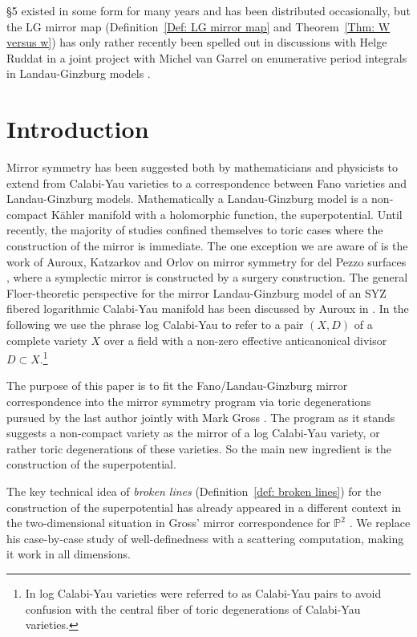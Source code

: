 \documentclass[11pt,letter]{amsart}
\theoremstyle{definition}
\theoremstyle{remark}
\numberwithin{equation}{section}
\numberwithin{figure}{section}
\newcommand{\PP} {\mathbb{P}}
\begin{document}
\S5 existed in some form for many years and has been distributed occasionally,
but the LG mirror map (Definition~\ref{Def: LG mirror map} and Theorem~\ref{Thm:
W versus w}) has only rather recently been spelled out in discussions with Helge
Ruddat in a joint project with Michel van Garrel on enumerative period integrals in Landau-Ginzburg models \cite{GRS}.



\section*{Introduction}
Mirror symmetry has been suggested both by mathematicians \cite{Givental} and
physicists \cite{Witten,HoriVafa} to extend from Calabi-Yau varieties to a
correspondence between Fano varieties and Landau-Ginzburg models. Mathematically
a Landau-Ginzburg model is a non-compact K\"ahler manifold with a holomorphic
function, the superpotential. Until recently, the majority of studies confined
themselves to toric cases where the construction of the mirror is immediate. The
one exception we are aware of is the work of Auroux, Katzarkov and Orlov on
mirror symmetry for del Pezzo surfaces \cite{AKO}, where a symplectic mirror is
constructed by a surgery construction. The general Floer-theoretic perspective
for the mirror Landau-Ginzburg model of an SYZ fibered logarithmic Calabi-Yau
manifold has been discussed by Auroux in \cite{auroux1,auroux2}. In the
following we use the phrase log Calabi-Yau to refer to a pair $(X,D)$ of a
complete variety $X$ over a field with a non-zero effective anticanonical
divisor $D\subset X$.\footnote{In \cite{affinecomplex} log Calabi-Yau varieties
were referred to as Calabi-Yau pairs to avoid confusion with the central fiber
of toric degenerations of Calabi-Yau varieties.}

The purpose of this paper is to fit the Fano/Landau-Ginzburg mirror
correspondence into the mirror symmetry program via toric degenerations pursued
by the last author jointly with Mark Gross \cite{logmirror,affinecomplex}. The
program as it stands suggests a non-compact variety as the mirror of a log
Calabi-Yau variety, or rather toric degenerations of these varieties. So the
main new ingredient is the construction of the superpotential.

The key technical idea of \emph{broken lines} (Definition~\ref{def: broken
lines}) for the construction of the superpotential has already appeared in a
different context in the two-dimensional situation in Gross' mirror
correspondence for $\PP^2$ \cite{PP2mirror}. We replace his case-by-case study
of well-definedness with a scattering computation, making it work in all
dimensions.
\end{document}
